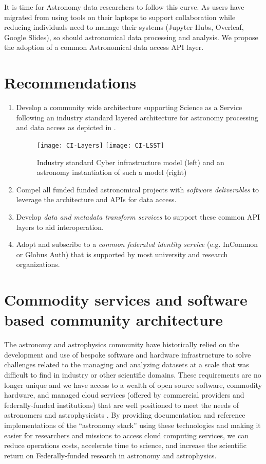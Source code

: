 It is time for Astronomy data researchers to follow this curve. As users have migrated
from using tools on their laptops to support collaboration while reducing
individuals need to manage their systems (Jupyter Hubs, Overleaf, Google Slides),
so should astronomical data processing and analysis. We propose the adoption of
a common Astronomical data access \gls{API} layer.


\section{Recommendations }
\begin{enumerate}
 \item Develop a community wide architecture supporting Science as a Service following
	an industry  standard layered architecture for astronomy processing and data access as
depicted in .


\begin{figure}
\centering
\texttt{[image: CI-Layers]}
\texttt{[image: CI-LSST]}
\caption{Industry standard Cyber infrastructure model (left) and an astronomy instantiation of such a model (right)\label{fig:ci}}
\end{figure}

\item Compel all funded funded astronomical projects with \emph{software deliverables} to  leverage the architecture and  APIs for data access.

\item Develop \emph{data and \gls{metadata} transform services}
to support these common \gls{API} layers to aid interoperation.

\item Adopt and subscribe to a \emph{common federated identity service} (e.g. InCommon or
Globus Auth) that is supported by most university and research organizations.
\end{enumerate}




\section{Commodity services and software based community architecture} \label{sec:refarc}
The astronomy and astrophysics community have historically relied on the development and use of bespoke software and hardware infrastructure to solve challenges related to the managing and analyzing datasets at a scale that was difficult to find in industry or other scientific domains.
These requirements are no longer unique and we have access to a wealth of open source software, commodity hardware, and managed cloud services (offered by commercial providers and federally-funded institutions) that are well positioned to meet the needs of astronomers and astrophysicists \citep{2019AAS...23345706M, 2019AAS...23324505B}.
By providing documentation and reference implementations of the “astronomy \gls{stack}” using these technologies and making it easier for researchers and missions to access cloud computing services, we can reduce operations costs, accelerate time to science, and increase the scientific return on Federally-funded research in astronomy and astrophysics.


